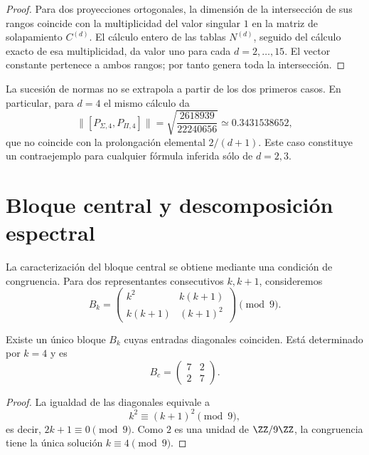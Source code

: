 \begin{proof}
Para dos proyecciones ortogonales, la dimensión de la intersección de sus
rangos coincide con la multiplicidad del valor singular \(1\) en la matriz
de solapamiento \(C^{(d)}\). El cálculo entero de las tablas
\(N^{(d)}\), seguido del cálculo exacto de esa multiplicidad, da valor uno
para cada \(d=2,\ldots,15\). El vector constante pertenece a ambos rangos;
por tanto genera toda la intersección.
\end{proof}

La sucesión de normas no se extrapola a partir de los dos primeros casos.
En particular, para \(d=4\) el mismo cálculo da
\[
 \|[P_{\Sigma,4},P_{\Pi,4}]\|
 =\sqrt{\frac{2618939}{22240656}}
 \simeq0.3431538652,
\]
que no coincide con la prolongación elemental \(2/(d+1)\). Este caso
constituye un contraejemplo para cualquier fórmula inferida sólo de
\(d=2,3\).

\section{Bloque central y descomposición espectral}

La caracterización del bloque central se obtiene mediante una condición de
congruencia. Para dos representantes consecutivos \(k,k+1\), consideremos
\[
B_k=
\begin{pmatrix}
k^2&k(k+1)\\
k(k+1)&(k+1)^2
\end{pmatrix}\pmod9.
\]

\begin{theorem}
\label{thm:app-bloque-central}
Existe un único bloque \(B_k\) cuyas entradas diagonales coinciden. Está
determinado por \(k=4\) y es
\[
B_c=
\begin{pmatrix}7&2\\2&7\end{pmatrix}.
\]
\end{theorem}

\begin{proof}
La igualdad de las diagonales equivale a
\[
k^2\equiv(k+1)^2\pmod9,
\]
es decir, \(2k+1\equiv0\pmod9\). Como \(2\) es una unidad de
\(\ZZ/9\ZZ\), la congruencia tiene la única solución \(k\equiv4\pmod9\).
\end{proof}

